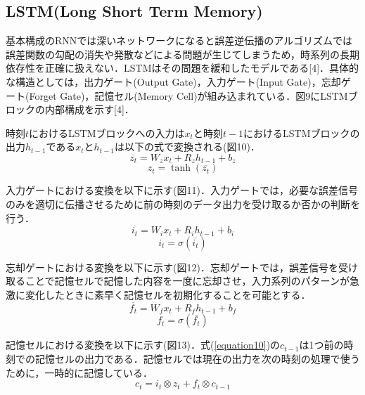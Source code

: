 \documentclass[twocolumn]{jsarticle}
\begin{document}
\subsection{LSTM(Long Short Term Memory)}
基本構成のRNNでは深いネットワークになると誤差逆伝播のアルゴリズムでは誤差関数の勾配の消失や発散などによる問題が生じてしまうため，時系列の長期依存性を正確に扱えない．LSTMはその問題を緩和したモデルである[4]．具体的な構造としては，出力ゲート(Output Gate)，入力ゲート(Input Gate)，忘却ゲート(Forget Gate)，記憶セル(Memory Cell)が組み込まれている．図9にLSTMブロックの内部構成を示す[4]．

時刻$t$におけるLSTMブロックへの入力は$x_t$と時刻$t - 1$におけるLSTMブロックの出力$h_{t-1}$である$x_t$と$h_{t-1}$は以下の式で変換される(図10)．
　 \begin{equation}
   \label{equation4}
      \overline{z_t} = W_zx_t + R_zh_{t-1} + b_z
   \end{equation}
   \begin{equation}
   \label{equation5}
      z_t = \tanh (\overline{z_t})
   \end{equation}

入力ゲートにおける変換を以下に示す(図11)．入力ゲートでは，必要な誤差信号のみを適切に伝播させるために前の時刻のデータ出力を受け取るか否かの判断を行う．
　 \begin{equation}
   \label{equation6}
      \overline{i_t} = W_ix_t + R_ih_{t-1} + b_i
   \end{equation}
   \begin{equation}
   \label{equation7}
      i_t = σ(\overline{i_t})
   \end{equation}

忘却ゲートにおける変換を以下に示す(図12)．忘却ゲートでは，誤差信号を受け取ることで記憶セルで記憶した内容を一度に忘却させ，入力系列のパターンが急激に変化したときに素早く記憶セルを初期化することを可能とする．
　 \begin{equation}
   \label{equation8}
      \overline{f_t} = W_fx_t + R_fh_{t-1} + b_f
   \end{equation}
   \begin{equation}
   \label{equation9}
      f_t = σ(\overline{f_t})
   \end{equation}

記憶セルにおける変換を以下に示す(図13)．式(\ref{equation10})の$c_{t-1}$は1つ前の時刻での記憶セルの出力である．記憶セルでは現在の出力を次の時刻の処理で使うために，一時的に記憶している．
　 \begin{equation}
   \label{equation10}
      c_t = i_t \otimes z_t + f_t \otimes c_{t-1}
   \end{equation}
\end{document}
